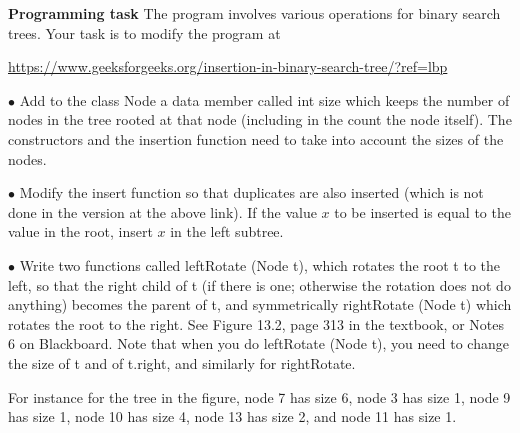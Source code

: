 \documentclass[11pt]{article}
\begin{document}
\bigskip


\newpage



\textbf{Programming task} The program involves various operations for binary search trees. Your task is to modify the program  at


\url{https://www.geeksforgeeks.org/insertion-in-binary-search-tree/?ref=lbp}
\medskip

$\bullet$ Add to the class \textsf{Node}  a data member called \textsf{int size} which keeps the number of nodes in the tree rooted at that node (including in the count the node itself). The constructors and the insertion function need to take into account the sizes of the nodes.
\medskip

$\bullet$ Modify the \textsf{insert} function so that duplicates are also inserted (which is not done in the version at the above link). If the value $x$  to be inserted is equal to the value in the root, insert $x$ in the left subtree.
\medskip





$\bullet$  Write two functions called \textsf{leftRotate (Node t)}, which rotates the root t to the left, so that the right child of t (if there is one; otherwise the rotation does not do anything) becomes the parent of t, and symmetrically  \textsf{rightRotate (Node t) which rotates the root to the right}. See Figure 13.2, page 313 in the textbook, or Notes 6 on Blackboard. Note that when you do \textsf{leftRotate (Node t)}, you need to change the size of \textsf{t} and of \textsf{t.right}, and similarly for \textsf{rightRotate}.



For instance for the tree in the figure,  node 7 has size 6, node 3 has size 1, node 9 has size 1, node 10 has size 4, node 13 has size 2, and node 11 has size 1.
\end{document}
